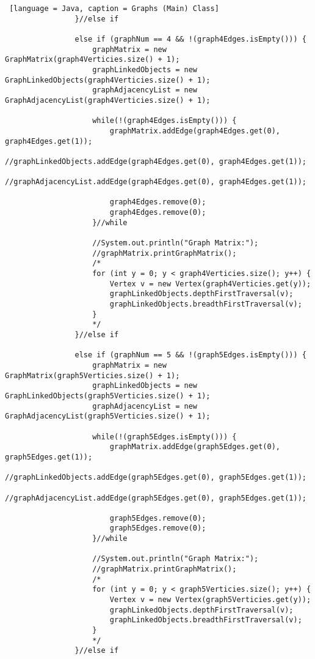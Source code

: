 \documentclass{article}
\begin{document}
\begin{lstlisting} [language = Java, caption = Graphs (Main) Class]
                }//else if

                else if (graphNum == 4 && !(graph4Edges.isEmpty())) {
                    graphMatrix = new GraphMatrix(graph4Verticies.size() + 1);
                    graphLinkedObjects = new GraphLinkedObjects(graph4Verticies.size() + 1);
                    graphAdjacencyList = new GraphAdjacencyList(graph4Verticies.size() + 1);

                    while(!(graph4Edges.isEmpty())) {
                        graphMatrix.addEdge(graph4Edges.get(0), graph4Edges.get(1));
                        //graphLinkedObjects.addEdge(graph4Edges.get(0), graph4Edges.get(1));
                        //graphAdjacencyList.addEdge(graph4Edges.get(0), graph4Edges.get(1));

                        graph4Edges.remove(0);
                        graph4Edges.remove(0);
                    }//while

                    //System.out.println("Graph Matrix:");
                    //graphMatrix.printGraphMatrix();
                    /*
                    for (int y = 0; y < graph4Verticies.size(); y++) {
                        Vertex v = new Vertex(graph4Verticies.get(y));
                        graphLinkedObjects.depthFirstTraversal(v);
                        graphLinkedObjects.breadthFirstTraversal(v);
                    }
                    */
                }//else if

                else if (graphNum == 5 && !(graph5Edges.isEmpty())) {
                    graphMatrix = new GraphMatrix(graph5Verticies.size() + 1);
                    graphLinkedObjects = new GraphLinkedObjects(graph5Verticies.size() + 1);
                    graphAdjacencyList = new GraphAdjacencyList(graph5Verticies.size() + 1);

                    while(!(graph5Edges.isEmpty())) {
                        graphMatrix.addEdge(graph5Edges.get(0), graph5Edges.get(1));
                        //graphLinkedObjects.addEdge(graph5Edges.get(0), graph5Edges.get(1));
                        //graphAdjacencyList.addEdge(graph5Edges.get(0), graph5Edges.get(1));

                        graph5Edges.remove(0);
                        graph5Edges.remove(0);
                    }//while

                    //System.out.println("Graph Matrix:");
                    //graphMatrix.printGraphMatrix();
                    /*
                    for (int y = 0; y < graph5Verticies.size(); y++) {
                        Vertex v = new Vertex(graph5Verticies.get(y));
                        graphLinkedObjects.depthFirstTraversal(v);
                        graphLinkedObjects.breadthFirstTraversal(v);
                    }
                    */
                }//else if



\end{lstlisting}
\end{document}
